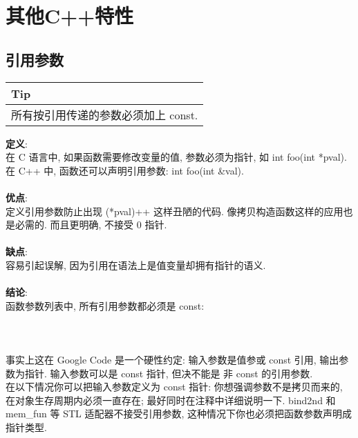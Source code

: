 \documentclass[a4paper,11pt,CJK]{article}
\begin{document}
\begin{CJK}{UTF8}{gbsn}
\begin{enumerate}
\end{enumerate}
\newpage

\section{其他C++特性}
\subsection{引用参数}
\begin{table}[htbp]
\flushleft
\begin{tabular}{p{400pt}}
\toprule
\rowcolor[gray]{.8} Tip \\
\midrule
所有按引用传递的参数必须加上 const.\\
\bottomrule
\end{tabular}
\end{table}
\noindent
\textbf{定义}:\\
\indent 在 C 语言中, 如果函数需要修改变量的值, 参数必须为指针, 如 int foo(int *pval). 在 C++ 中, 函数还可以声明引用参数: int foo(int \&val).\\
\\
\textbf{优点}:\\
\indent 定义引用参数防止出现 (*pval)++ 这样丑陋的代码. 像拷贝构造函数这样的应用也是必需的. 而且更明确, 不接受 0 指针.\\
\\
\textbf{缺点}:\\
\indent 容易引起误解, 因为引用在语法上是值变量却拥有指针的语义.\\
\\
\textbf{结论}:\\
\indent 函数参数列表中, 所有引用参数都必须是 const:\\
\\
\\
\\
\indent 事实上这在 Google Code 是一个硬性约定: 输入参数是值参或 const 引用, 输出参数为指针. 输入参数可以是 const 指针, 但决不能是 非 const 的引用参数.\\
\indent 在以下情况你可以把输入参数定义为 const 指针: 你想强调参数不是拷贝而来的, 在对象生存周期内必须一直存在; 最好同时在注释中详细说明一下. bind2nd 和 mem\_fun 等 STL 适配器不接受引用参数, 这种情况下你也必须把函数参数声明成指针类型.


\end{CJK}
\end{document}
